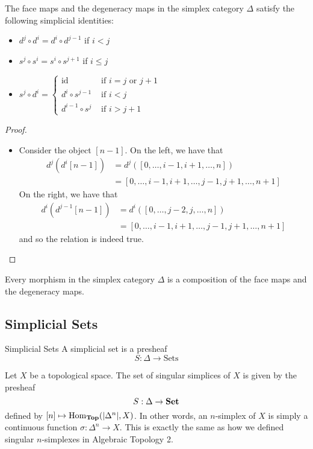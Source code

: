 \documentclass[a4paper]{article}
\begin{document}
\begin{prp}{}{} The face maps and the degeneracy maps in the simplex category $\Delta$ satisfy the following simplicial identities: 
\begin{itemize}
\item $d^j\circ d^i=d^i\circ d^{j-1}$ if $i<j$
\item $s^j\circ s^i=s^i\circ s^{j+1}$ if $i\leq j$
\item $s^j\circ d^i=\begin{cases}
\text{id} & \text{ if } i=j\text{ or }j+1\\
d^i\circ s^{j-1} & \text{ if } i<j\\
d^{i-1}\circ s^j & \text{ if }i>j+1
\end{cases}$
\end{itemize} \tcbline
\begin{proof}~\\
\begin{itemize}
\item Consider the object $[n-1]$. On the left, we have that 
\begin{align*}
d^j(d^i[n-1])&=d^j([0,\dots,i-1,i+1,\dots,n])\\
&=[0,\dots,i-1,i+1,\dots,j-1,j+1,\dots,n+1]
\end{align*}
On the right, we have that
\begin{align*}
d^i(d^{j-1}[n-1])&=d^i([0,\dots,j-2,j,\dots,n])\\
&=[0,\dots,i-1,i+1,\dots,j-1,j+1,\dots,n+1]
\end{align*} and so the relation is indeed true. 
\end{itemize}
\end{proof}
\end{prp}

\begin{prp}{}{} Every morphism in the simplex category $\Delta$ is a composition of the face maps and the degeneracy maps. 
\end{prp}

\subsection{Simplicial Sets}
\begin{defn}{Simplicial Sets}{} A simplicial set is a presheaf $$S:\Delta\to\text{Sets}$$ 
\end{defn}

\begin{eg}{}{} Let $X$ be a topological space. The set of singular simplices of $X$ is given by the presheaf $$S:\Delta\to\bold{Set}$$ defined by $[n]\mapsto\operatorname{Hom}_\bold{Top}(\abs{\Delta^n},X)$. In other words, an $n$-simplex of $X$ is simply a continuous function $\sigma:\Delta^n\to X$. This is exactly the same as how we defined singular $n$-simplexes in Algebraic Topology 2. 
\end{eg}
\end{document}
